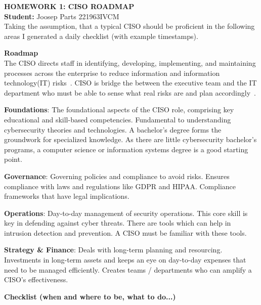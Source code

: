 \textbf{HOMEWORK 1: CISO ROADMAP}\\
\textbf{Student:} Joosep Parts 221963IVCM\\

Taking the assumption, that a typical CISO should be proficient in the following areas I generated a daily checklist (with example
timestamps).

\textbf{Roadmap}\\


The CISO directs staff in identifying, developing, implementing, and maintaining processes across the enterprise to reduce information
and information technology(IT) risks~\cite[587-588]{HOOPER2016585}.
CISO is bridge the between the executive team and the IT department who must be able to sense what
real risks are and plan accordingly~\cite[261]{10658980701746577}.

\textbf{Foundations}: The foundational aspects of the CISO role, comprising key educational and skill-based competencies.
Fundamental to understanding cybersecurity theories and technologies.
A bachelor's degree forms the groundwork for specialized knowledge. As there are little cybersecurity bachelor's programs, a computer
science or information systems degree is a good starting point.

\textbf{Governance}: Governing policies and compliance to avoid risks.
Ensures compliance with laws and regulations like GDPR and HIPAA.
Compliance frameworks that have legal implications.

\textbf{Operations}: Day-to-day management of security operations.
This core skill is key in defending against cyber threats.
There are tools which can help in intrusion detection and prevention. A CISO must
be familiar with these tools.

\textbf{Strategy \& Finance}: Deals with long-term planning and resourcing.
Investments in long-term assets and keeps an eye on day-to-day expenses that need to be managed efficiently.
Creates teams / departments who can amplify a CISO's effectiveness.

\textbf{Checklist (when and where to be, what to do...)}\\

